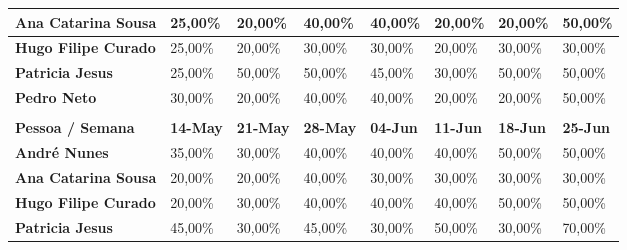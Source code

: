 \documentclass[a4paper]{report}
\begin{document}
\begin{table}[h]
\begin{tabular}{llllllll}
\multicolumn{1}{l|}{\textbf{Ana Catarina Sousa}} & \multicolumn{1}{l|}{25,00\%} & \multicolumn{1}{l|}{20,00\%} & \multicolumn{1}{l|}{40,00\%} & \multicolumn{1}{l|}{40,00\%} & \multicolumn{1}{l|}{20,00\%} & \multicolumn{1}{l|}{20,00\%} & 50,00\% \\ \hline
\multicolumn{1}{l|}{\textbf{Hugo Filipe Curado}} & \multicolumn{1}{l|}{25,00\%} & \multicolumn{1}{l|}{20,00\%} & \multicolumn{1}{l|}{30,00\%} & \multicolumn{1}{l|}{30,00\%} & \multicolumn{1}{l|}{20,00\%} & \multicolumn{1}{l|}{30,00\%} & 30,00\% \\ \hline
\multicolumn{1}{l|}{\textbf{Patricia Jesus}} & \multicolumn{1}{l|}{25,00\%} & \multicolumn{1}{l|}{50,00\%} & \multicolumn{1}{l|}{50,00\%} & \multicolumn{1}{l|}{45,00\%} & \multicolumn{1}{l|}{30,00\%} & \multicolumn{1}{l|}{50,00\%} & 50,00\% \\ \hline
\multicolumn{1}{l|}{\textbf{Pedro Neto}} & \multicolumn{1}{l|}{30,00\%} & \multicolumn{1}{l|}{20,00\%} & \multicolumn{1}{l|}{40,00\%} & \multicolumn{1}{l|}{40,00\%} & \multicolumn{1}{l|}{20,00\%} & \multicolumn{1}{l|}{20,00\%} & 50,00\% \\
\textbf{} &  &  &  &  &  &  &  \\
\multicolumn{1}{l|}{\textbf{Pessoa / Semana}} & \multicolumn{1}{l|}{\textbf{14-May}} & \multicolumn{1}{l|}{\textbf{21-May}} & \multicolumn{1}{l|}{\textbf{28-May}} & \multicolumn{1}{l|}{\textbf{04-Jun}} & \multicolumn{1}{l|}{\textbf{11-Jun}} & \multicolumn{1}{l|}{\textbf{18-Jun}} & \textbf{25-Jun} \\ \hline
\multicolumn{1}{l|}{\textbf{André Nunes}} & \multicolumn{1}{l|}{35,00\%} & \multicolumn{1}{l|}{30,00\%} & \multicolumn{1}{l|}{40,00\%} & \multicolumn{1}{l|}{40,00\%} & \multicolumn{1}{l|}{40,00\%} & \multicolumn{1}{l|}{50,00\%} & 50,00\% \\ \hline
\multicolumn{1}{l|}{\textbf{Ana Catarina Sousa}} & \multicolumn{1}{l|}{20,00\%} & \multicolumn{1}{l|}{20,00\%} & \multicolumn{1}{l|}{40,00\%} & \multicolumn{1}{l|}{30,00\%} & \multicolumn{1}{l|}{30,00\%} & \multicolumn{1}{l|}{30,00\%} & 30,00\% \\ \hline
\multicolumn{1}{l|}{\textbf{Hugo Filipe Curado}} & \multicolumn{1}{l|}{20,00\%} & \multicolumn{1}{l|}{30,00\%} & \multicolumn{1}{l|}{40,00\%} & \multicolumn{1}{l|}{40,00\%} & \multicolumn{1}{l|}{40,00\%} & \multicolumn{1}{l|}{50,00\%} & 50,00\% \\ \hline
\multicolumn{1}{l|}{\textbf{Patricia Jesus}} & \multicolumn{1}{l|}{45,00\%} & \multicolumn{1}{l|}{30,00\%} & \multicolumn{1}{l|}{45,00\%} & \multicolumn{1}{l|}{30,00\%} & \multicolumn{1}{l|}{50,00\%} & \multicolumn{1}{l|}{30,00\%} & 70,00\% \\ \hline

\end{tabular}
\end{table}
\end{document}
